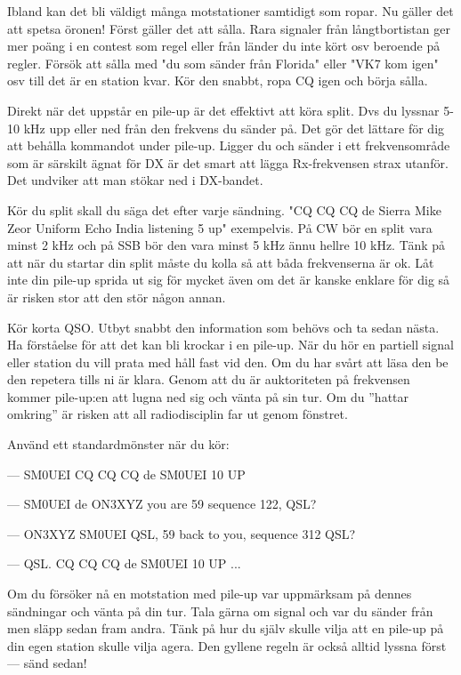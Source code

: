 Ibland kan det bli väldigt många motstationer samtidigt som ropar. Nu gäller det att spetsa öronen! Först gäller det att sålla. Rara signaler från långtbortistan ger mer poäng i en contest som regel eller från länder du inte kört osv beroende på regler. Försök att sålla med "du som sänder från Florida" eller "VK7 kom igen" osv till det är en station kvar. Kör den snabbt, ropa CQ igen och börja sålla.

Direkt när det uppstår en pile-up är det effektivt att köra split. Dvs du lyssnar 5-10 kHz upp eller ned från den frekvens du sänder på. Det gör det lättare för dig att behålla kommandot under pile-up. Ligger du och sänder i ett frekvensområde som är särskilt ägnat för DX är det smart att lägga Rx-frekvensen strax utanför. Det undviker att man stökar ned i DX-bandet.

Kör du split skall du säga det efter varje sändning. "CQ CQ CQ de Sierra Mike Zeor Uniform Echo India listening 5 up" exempelvis. På CW bör en split vara minst 2 kHz och på SSB bör den vara minst 5 kHz ännu hellre 10 kHz. Tänk på att när du startar din split måste du kolla så att båda frekvenserna är ok. Låt inte din pile-up sprida ut sig för mycket även om det är kanske enklare för dig så är risken stor att den stör någon annan. 

Kör korta QSO. Utbyt snabbt den information som behövs och ta sedan nästa. Ha förståelse för att det kan bli krockar i en pile-up. När du hör en partiell signal eller station du vill prata med håll fast vid den. Om du har svårt att läsa den be den repetera tills ni är klara. Genom att du är auktoriteten på frekvensen kommer pile-up:en att lugna ned sig och vänta på sin tur. Om du ''hattar omkring'' är risken att all radiodisciplin far ut genom fönstret.

Använd ett standardmönster när du kör:

--- SM0UEI CQ CQ CQ de SM0UEI 10 UP

--- SM0UEI de ON3XYZ you are 59 sequence 122, QSL?

--- ON3XYZ SM0UEI QSL, 59 back to you, sequence 312 QSL?

--- QSL. CQ CQ CQ de SM0UEI 10 UP ...

Om du försöker nå en motstation med pile-up var uppmärksam på dennes sändningar och vänta på din tur. Tala gärna om signal och var du sänder från men släpp sedan fram andra. Tänk på hur du själv skulle vilja att en pile-up på din egen station skulle vilja agera. Den gyllene regeln är också alltid lyssna först --- sänd sedan!
